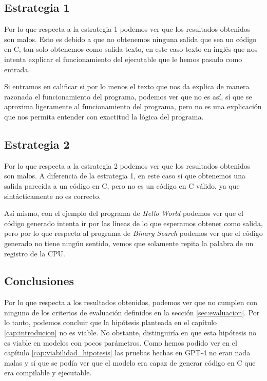 \subsection{Estrategia 1}
\label{subsec:analisis_resultados:estrategia_1}


Por lo que respecta a la estrategia 1 podemos ver que los resultados obtenidos son malos.
Esto es debido a que no obtenemos ninguna salida que sea un código en C, tan solo obtenemos
como salida texto, en este caso texto en inglés que nos intenta explicar el funcionamiento
del ejecutable que le hemos pasado como entrada.

Si entramos en calificar si por lo menos el texto que nos da explica de manera razonada el
funcionamiento del programa, podemos ver que no es así, sí que se aproxima ligeramente al
funcionamiento del programa, pero no es una explicación que nos permita entender con
exactitud la lógica del programa.

\subsection{Estrategia 2}
\label{subsec:analisis_resultados:estrategia_2}


Por lo que respecta a la estrategia 2 podemos ver que los resultados obtenidos son malos.
A diferencia de la estrategia 1, en este caso sí que obtenemos una salida parecida a un
código en C, pero no es un código en C válido, ya que sintácticamente no es correcto.

Así mismo, con el ejemplo del programa de \textit{Hello World} podemos ver que el código
generado intenta ir por las líneas de lo que esperamos obtener como salida, pero por lo que
respecta al programa de \textit{Binary Search} podemos ver que el código generado no tiene
ningún sentido, vemos que solamente repita la palabra de un registro de la CPU.

\subsection{Conclusiones}
\label{subsec:analisis_resultados:conclusiones}


Por lo que respecta a los resultados obtenidos, podemos ver que no cumplen con ninguno de los
criterios de evaluación definidos en la sección \ref{sec:evaluacion}. Por lo tanto, podemos
concluir que la hipótesis planteada en el capítulo \ref{cap:introducion} no es viable.
No obstante, distinguiría en que esta hipótesis no es viable en modelos con pocos parámetros. Como
hemos podido ver en el capítulo \ref{cap:viabilidad_hipotesis} las pruebas hechas en GPT-4 no
eran nada malas y sí que se podía ver que el modelo era capaz de generar código en C que era
compilable y ejecutable.

